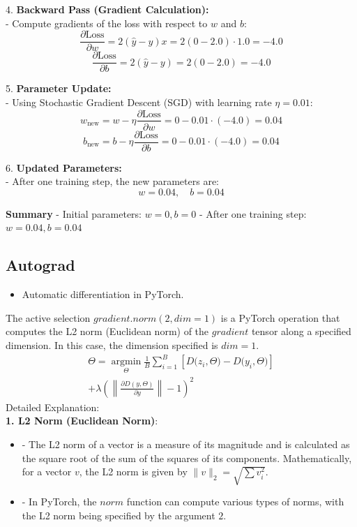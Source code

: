 \documentclass{article}
\begin{document}
4. \textbf{Backward Pass (Gradient Calculation):} \\
   - Compute gradients of the loss with respect to \( w \) and \( b \): \\
     \[
     \frac{\partial \text{Loss}}{\partial w} = 2(\hat{y} - y)x = 2(0 - 2.0) \cdot 1.0 = -4.0 
     \]
     \[
     \frac{\partial \text{Loss}}{\partial b} = 2(\hat{y} - y) = 2(0 - 2.0) = -4.0
     \]

5. \textbf{Parameter Update:}\\
   - Using Stochastic Gradient Descent (SGD) with learning rate \( \eta = 0.01 \): \\
     \[
     w_{\text{new}} = w - \eta \frac{\partial \text{Loss}}{\partial w} = 0 - 0.01 \cdot (-4.0) = 0.04
     \]
     \[
     b_{\text{new}} = b - \eta \frac{\partial \text{Loss}}{\partial b} = 0 - 0.01 \cdot (-4.0) = 0.04
     \]

6. \textbf{Updated Parameters:}\\
   - After one training step, the new parameters are:\\
     \[
     w = 0.04, \quad b = 0.04
     \]

\textbf{Summary}
- Initial parameters: \( w = 0, b = 0 \)
- After one training step: \( w = 0.04, b = 0.04 \)
\subsection{Autograd}
\begin{itemize}
    \item Automatic differentiation in PyTorch.
\end{itemize}
The active selection $gradient.norm(2, dim=1)$ is a PyTorch operation that computes the L2 norm (Euclidean norm) of the $gradient$ tensor along a specified dimension. 
In this case, the dimension specified is $dim=1$.
$$\begin{array}{c}{{\Theta=\!\operatorname*{argmin}_{\Theta}\frac1B\sum_{i=1}^{B}\left[D\Big(z_{i},\Theta\Big)-D\Big(y_{i},\Theta\Big)\right]}}\\ {{+\lambda\!\left(\left\|\frac{\partial D(y,\Theta)}{\partial y}\right\|-1\right)^{2}}}\end{array}$$
Detailed Explanation:\\

\textbf{1. L2 Norm (Euclidean Norm)}: \\

\begin{itemize}
  \item    - The L2 norm of a vector is a measure of its magnitude and is calculated as the square root of the sum of the squares of its components. Mathematically, for a vector \( v \), the L2 norm is given by \( \|v\|_2 = \sqrt{\sum v_i^2} \).\\
  \item    - In PyTorch, the $norm$ function can compute various types of norms, with the L2 norm being specified by the argument $2$. \\
\end{itemize} 
\end{document}
